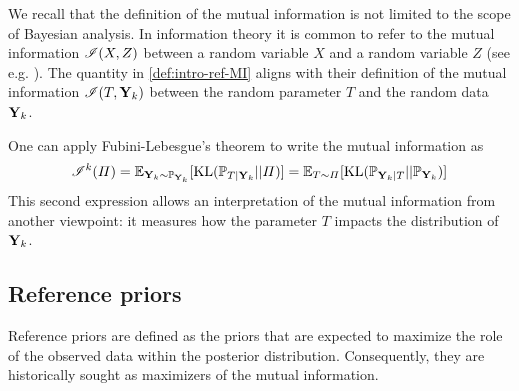 



We recall that the definition of the mutual information is not limited to the scope of Bayesian analysis. In information theory it is common to refer to the mutual information $\mathscr{I}(X,Z)$ between a random variable $X$ and a random variable $Z$ (see e.g. \cite{mackay_information_2003}). The quantity in \cref{def:intro-ref-MI} aligns with their definition of the mutual information $\mathscr{I}(T,\mathbf{Y}_k)$ between the random parameter $T$ and the random data $\mathbf{Y}_k$.

One can apply Fubini-Lebesgue's theorem to write the mutual information as
\begin{equation}
    \mathscr{I}^k(\varPi) =  \mathbb{E}_{\mathbf{Y}_k\sim \mathbb{P}_{\mathbf{Y}_k}}[\text{KL}(\mathbb{P}_{T|\mathbf{Y}_k}||\varPi)] =  \mathbb{E}_{T\sim\varPi}[\text{KL}(\mathbb{P}_{\mathbf{Y}_k|T}||\mathbb{P}_{\mathbf{Y}_k}) ]
\end{equation}
This second expression allows an interpretation of the mutual information from another viewpoint: it measures how the parameter $T$ impacts the distribution of $\mathbf{Y}_k$.










\subsection{Reference priors}\label{sec:intro-ref:refpriors}

Reference priors are defined as the priors that are expected to maximize the role of the observed data within the posterior distribution.
Consequently, they are historically sought as maximizers of the mutual information.

